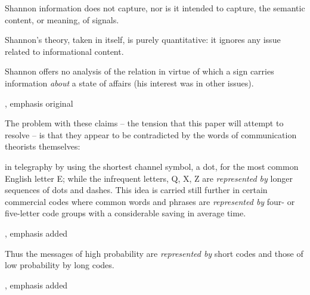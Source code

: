 \documentclass[12pt]{article}
\begin{document}
\begin{myquote}
Shannon information does not capture, nor is it intended to capture, the semantic content, or meaning, of signals.
\par\hspace*{\fill}\citet[21]{piccinini2011information}
\end{myquote}

\begin{myquote}
Shannon’s theory, taken in itself, is purely quantitative: it ignores any issue related to informational content.
\par\hspace*{\fill}\citet[1989]{lombardi2015shannon}
\end{myquote}

\begin{myquote}
Shannon offers no analysis of the relation in virtue of which a sign carries information \textit{about} a state of affairs (his interest was in other issues).
\par\hspace*{\fill}\citet[7]{neander2017mark}, emphasis original
\end{myquote}

\noindent The problem with these claims -- the tension that this paper will attempt to resolve -- is that they appear to be contradicted by the words of communication theorists themselves:

\begin{myquote}
 in telegraphy by using the shortest channel symbol, a dot, for the most common English letter E; while the infrequent letters, Q, X, Z are \textit{represented by} longer sequences of dots and dashes. This idea is carried still further in certain commercial codes where common words and phrases are \textit{represented by} four- or five-letter code groups with a considerable saving in average time.
\par\hspace*{\fill}\citet[385]{shannon1948mathematicalc}, emphasis added
\end{myquote}

\begin{myquote}
Thus the messages of high probability are \textit{represented by} short codes and those of low probability by long codes.
\par\hspace*{\fill}\citet[402]{shannon1948mathematicalc}, emphasis added
\end{myquote}
\end{document}
